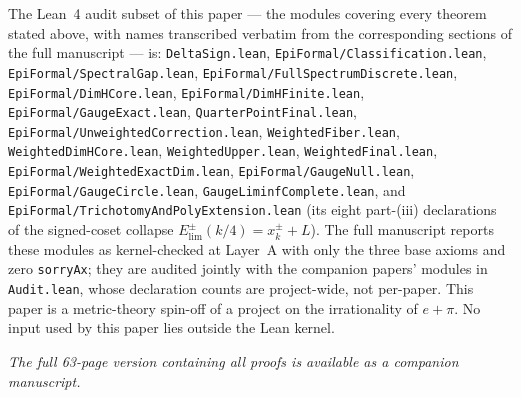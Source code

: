 The Lean~4 audit subset of this paper --- the modules covering every theorem
stated above, with names transcribed verbatim from the corresponding sections
of the full manuscript --- is: \texttt{DeltaSign.lean},
\texttt{EpiFormal/Classification.lean}, \texttt{EpiFormal/SpectralGap.lean},
\texttt{EpiFormal/FullSpectrumDiscrete.lean}, \texttt{EpiFormal/DimHCore.lean},
\texttt{EpiFormal/DimHFinite.lean}, \texttt{EpiFormal/GaugeExact.lean},
\texttt{QuarterPointFinal.lean}, \texttt{EpiFormal/UnweightedCorrection.lean},
\texttt{WeightedFiber.lean}, \texttt{WeightedDimHCore.lean},
\texttt{WeightedUpper.lean}, \texttt{WeightedFinal.lean},
\texttt{EpiFormal/WeightedExactDim.lean}, \texttt{EpiFormal/GaugeNull.lean},
\texttt{EpiFormal/GaugeCircle.lean}, \texttt{GaugeLiminfComplete.lean}, and
\texttt{EpiFormal/TrichotomyAndPolyExtension.lean} (its eight part-(iii)
declarations of the signed-coset collapse
$E_{\mathrm{lim}}^\pm(k/4)=x_k^\pm+L$). The full manuscript reports these
modules as kernel-checked at Layer~A with only the three base axioms and zero
\texttt{sorryAx}; they are audited jointly with the companion papers' modules
in \texttt{Audit.lean}, whose declaration counts are project-wide, not
per-paper. This paper is a metric-theory spin-off of a project on the
irrationality of $e+\pi$. No input used by this paper lies outside the Lean
kernel.

\emph{The full 63-page version containing all proofs is available as a companion manuscript.}
